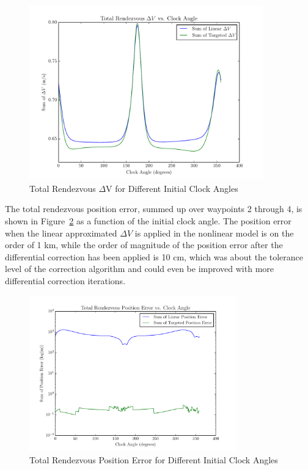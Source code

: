 \documentclass[letterpaper, preprint, paper,11pt]{AAS}	%
\begin{document}
\begin{figure}[htb] 
	\begin{center}
		\includegraphics[width=0.9\textwidth]{Total_DV_2_1degsteps} 
		\caption{Total Rendezvous \(\Delta\)V for Different Initial Clock Angles}
		\label{fig:DV_2}
	\end{center}
\end{figure}

The total rendezvous position error, summed up over waypoints 2 through 4, is shown in Figure~\ref{fig:PosErr_2} as a function of the initial clock angle.  The position error when the linear approximated \(\Delta V\) is applied in the nonlinear model is on the order of 1 km, while the order of magnitude of the position error after the differential correction has been applied is 10 cm, which was about the tolerance level of the correction algorithm and could even be improved with more differential correction iterations.

\begin{figure}[htb] 
	\begin{center}
		\includegraphics[width=0.8\textwidth]{Log_Position_Error_2_1degsteps} 
		\caption{Total Rendezvous Position Error for Different Initial Clock Angles}
		\label{fig:PosErr_2}
	\end{center}
\end{figure}
\end{document}
